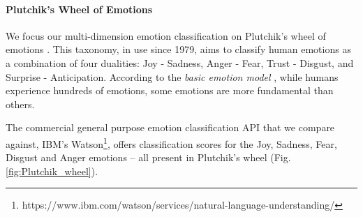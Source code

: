 \documentclass[letterpaper]{article} %
\begin{document}
\begin{table}[!bp]
\caption{Difficult video game tweets.}
\label{table:video-game-tweets}
\end{table}
\paragraph{Plutchik's Wheel of Emotions}
We focus our multi-dimension emotion classification on Plutchik's wheel of emotions \protect\cite{Plutchik1979}. This taxonomy, in use since 1979, aims to classify human emotions as a combination of four dualities: Joy - Sadness, Anger - Fear, Trust - Disgust, and Surprise - Anticipation. According to the \textit{basic emotion model} \protect\cite{Ekman2013AnAF}, while humans experience hundreds of emotions, some emotions are more fundamental than others.

The commercial general purpose emotion classification API that we compare against, IBM's Watson\footnote{https://www.ibm.com/watson/services/natural-language-understanding/}, offers classification scores for the Joy, Sadness, Fear, Disgust and Anger emotions -- all present in Plutchik's wheel (Fig. \ref{fig:Plutchik_wheel}).
\end{document}
